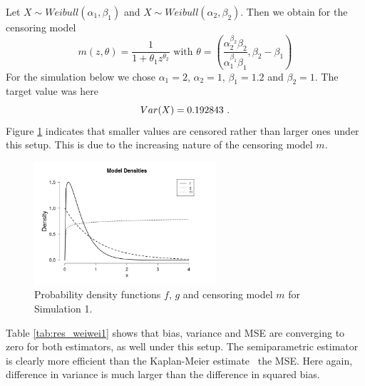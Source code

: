 Let $X \sim Weibull(\alpha_1, \beta_1)$ and  $X \sim Weibull(\alpha_2, \beta_2)$.
Then we obtain for the censoring model 
$$m(z,\theta) = \frac{1}{1+\theta_1 z^{\theta_2}} \textrm{ with } \theta = \left(\frac{\alpha_2^{\beta_2}\beta_2}{\alpha_1^{\beta_1}\beta_1}, \beta_2 - \beta_1\right)$$
%
For the simulation below we chose $\alpha_1 = 2$, $\alpha_2 = 1$, $\beta_1 = 1.2$ and $\beta_2 = 1$. The target value was here
$$Var(X) = 0.192843\textrm{ .}$$
Figure \ref{fig:dens_wei_wei} indicates that smaller values are censored rather than larger ones under this setup.  This is due to the increasing nature of the censoring model $m$.
%
\clearpage
%
\begin{figure}[h!]
	\begin{center}
		\includegraphics[width=0.6\textwidth]{./figures/wei_wei_dens2}
	\end{center}
	\caption{Probability density functions $f$, $g$ and censoring model $m$ for Simulation 1.}
	\label{fig:dens_wei_wei}
\end{figure}
\noindent Table \ref{tab:res_weiwei1} shows that bias, variance and MSE are converging to zero for both estimators, as well under this setup. The semiparametric estimator is clearly more efficient than the Kaplan-Meier estimate \wrt\ the MSE. Here again, difference in variance is much larger than the difference in squared bias. 
%
